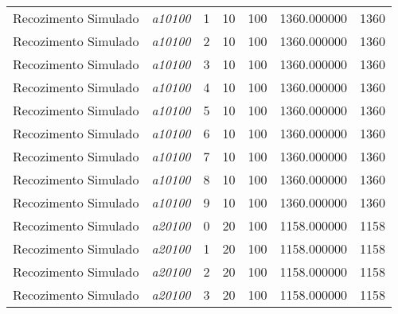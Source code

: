 {\begin{longtable}{cc|c|cc|cc}
			Recozimento Simulado & \textit{a10100}    & 1                               & 10               & 100              & 1360.000000                          & 1360 \\ 
			Recozimento Simulado & \textit{a10100}    & 2                               & 10               & 100              & 1360.000000                          & 1360 \\ 
			Recozimento Simulado & \textit{a10100}    & 3                               & 10               & 100              & 1360.000000                          & 1360 \\ 
			Recozimento Simulado & \textit{a10100}    & 4                               & 10               & 100              & 1360.000000                          & 1360 \\ 
			Recozimento Simulado & \textit{a10100}    & 5                               & 10               & 100              & 1360.000000                          & 1360 \\ 
			Recozimento Simulado & \textit{a10100}    & 6                               & 10               & 100              & 1360.000000                          & 1360 \\ 
			Recozimento Simulado & \textit{a10100}    & 7                               & 10               & 100              & 1360.000000                          & 1360 \\ 
			Recozimento Simulado & \textit{a10100}    & 8                               & 10               & 100              & 1360.000000                          & 1360 \\ 
			Recozimento Simulado & \textit{a10100}    & 9                               & 10               & 100              & 1360.000000                          & 1360 \\ \hline
			Recozimento Simulado & \textit{a20100}    & 0                               & 20               & 100              & 1158.000000                          & 1158 \\ 
			Recozimento Simulado & \textit{a20100}    & 1                               & 20               & 100              & 1158.000000                          & 1158 \\ 
			Recozimento Simulado & \textit{a20100}    & 2                               & 20               & 100              & 1158.000000                          & 1158 \\ 
			Recozimento Simulado & \textit{a20100}    & 3                               & 20               & 100              & 1158.000000                          & 1158 \\ 

\end{longtable}}
